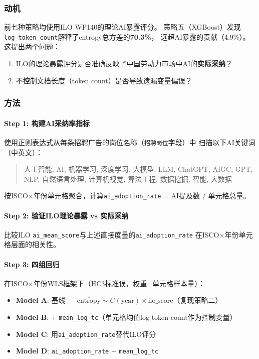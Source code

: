 \documentclass[12pt,a4paper]{ctexart}
\begin{document}
\subsubsection{动机}

前七种策略均使用ILO WP140的理论AI暴露评分。
策略五（XGBoost）发现\texttt{log\_token\_count}解释了entropy总方差的\textbf{70.3\%}，
远超AI暴露的贡献（4.9\%）。这提出两个问题：

\begin{enumerate}
\item ILO的理论暴露评分是否准确反映了中国劳动力市场中AI的\textbf{实际采纳}？
\item 不控制文档长度（token count）是否导致遗漏变量偏误？
\end{enumerate}

\subsubsection{方法}

\paragraph{Step 1: 构建AI采纳率指标}

使用正则表达式从每条招聘广告的岗位名称（\texttt{招聘岗位}字段）中
扫描以下AI关键词（中英文）：

\begin{quote}
\small
人工智能, AI, 机器学习, 深度学习, 大模型, LLM, ChatGPT, AIGC, GPT, NLP,
自然语言处理, 计算机视觉, 算法工程, 数据挖掘, 智能, 大数据
\end{quote}

按ISCO$\times$年份单元格聚合，计算\texttt{ai\_adoption\_rate} = AI提及数 / 单元格总量。

\paragraph{Step 2: 验证ILO理论暴露 vs 实际采纳}

比较ILO \texttt{ai\_mean\_score}与上述直接度量的\texttt{ai\_adoption\_rate}
在ISCO$\times$年份单元格层面的相关性。

\paragraph{Step 3: 四组回归}

在ISCO$\times$年份WLS框架下（HC3标准误，权重=单元格样本量）：

\begin{itemize}
\item \textbf{Model A}: 基线 — $\overline{\text{entropy}} \sim C(\text{year}) \times \text{ilo\_score}$（复现策略二）
\item \textbf{Model B}: $+$ \texttt{mean\_log\_tc}（单元格均值log token count作为控制变量）
\item \textbf{Model C}: 用\texttt{ai\_adoption\_rate}替代ILO评分
\item \textbf{Model D}: \texttt{ai\_adoption\_rate} $+$ \texttt{mean\_log\_tc}
\end{itemize}
\end{document}
